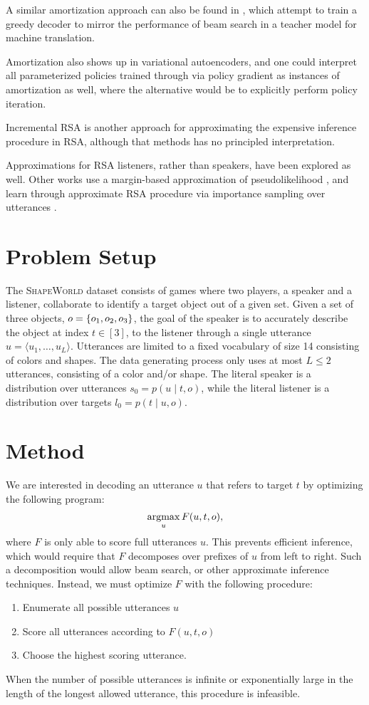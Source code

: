 \documentclass[11pt,a4paper]{article}
\begin{document}
A similar amortization approach can also be found in \citet{gu2017trainable},
which attempt to train a greedy decoder to mirror the performance
of beam search in a teacher model for machine translation.

Amortization also shows up in variational autoencoders,
and one could interpret all parameterized policies trained through via policy gradient 
as instances of amortization as well,
where the alternative would be to explicitly perform policy iteration.

Incremental RSA \citep{cohngordon2018pragmatically} is another approach 
for approximating the expensive inference procedure in RSA,
although that methods has no principled interpretation.

Approximations for RSA listeners, rather than speakers, have been explored as well.
Other works use a margin-based approximation of pseudolikelihood \citep{gulordava2020dax},
and learn through approximate RSA procedure via importance sampling over utterances
\citep{mcdowell2019learning}.


\section{Problem Setup}
The \textsc{ShapeWorld} dataset consists of games where two players,
a speaker and a listener, collaborate to identify a target object out of a given set.
Given a set of three objects, $o = \left\{o_1,o_2,o_3\right\}$, the goal of the speaker
is to accurately describe the object at index $t\in [3]$,
to the listener through a single utterance
$u = \langle u_1, \ldots, u_L \rangle$.
Utterances are limited to a fixed vocabulary of size 14 consisting of colors and shapes.
The data generating process only uses at most $L \le 2$ utterances,
consisting of a color and/or shape.
The literal speaker is a distribution over utterances $s_0 = p(u \mid t, o)$, while
the literal listener is a distribution over targets $l_0 = p(t \mid u, o)$.

\section{Method}
We are interested in decoding an utterance $u$ that refers to target $t$ 
by optimizing the following program:
\begin{equation}
\operatorname*{argmax}_u F(u, t, o),
\end{equation}
where $F$ is only able to score full utterances $u$.
This prevents efficient inference, which would require that $F$
decomposes over prefixes of $u$ from left to right.
Such a decomposition would allow beam search, or other approximate inference techniques.
Instead, we must optimize $F$ with the following procedure:
\begin{enumerate}
\item Enumerate all possible utterances $u$
\item Score all utterances according to $F(u,t,o)$
\item Choose the highest scoring utterance.
\end{enumerate}
When the number of possible utterances is infinite or exponentially large
in the length of the longest allowed utterance, this procedure is infeasible.
\end{document}
